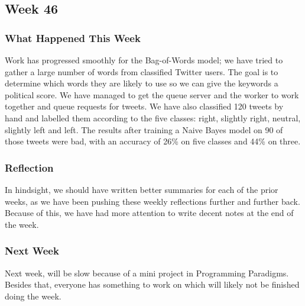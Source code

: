 \subsection{Week 46} 
\subsubsection{What Happened This Week} 
Work has progressed smoothly for the Bag-of-Words model; we have tried to
gather a large number of words from classified Twitter users. The goal is to
determine which words they are likely to use so we can give the keywords a political
score. We have managed to get the queue server and the worker to work together
and queue requests for tweets. We have also classified 120 tweets by hand and
labelled them according to the five classes: right, slightly right, neutral,
slightly left and left. The results after training a Naive Bayes model on 90 of
those tweets were bad, with an accuracy of 26\% on five classes and 44\% on
three.

\subsubsection{Reflection} 
In hindsight, we should have written better summaries for each of the prior
weeks, as we have been pushing these weekly reflections further and further
back. Because of this, we have had more attention to write decent notes
at the end of the week.

\subsubsection{Next Week} 
Next week, will be slow because of a mini project in Programming Paradigms.
Besides that, everyone has something to work on which will likely not be
finished doing the week.



